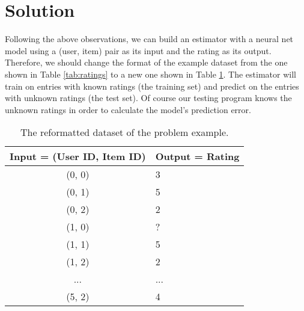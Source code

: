\documentclass[letterpaper]{article}
\begin{document}
\section{Solution}
Following the above observations, we can build an estimator with a neural net 
model using a (user, item) pair as its input and the rating as its output.
Therefore, we should change the format of the example dataset from the one 
shown in Table \ref{tab:ratings} to a new one shown in Table \ref{tab:rating}.
The estimator will train on entries with known ratings (the training set) 
and predict on the entries with unknown ratings (the test set).
Of course our testing program knows the unknown ratings in order to calculate 
the model's prediction error.
\begin{table}[!htb]
	\centering
	\caption{The reformatted dataset of the problem example.}
	\begin{tabularx}{0.47\textwidth}{|c|X|}  \hline \rowcolor{blue!50}
		Input = (User ID, Item ID) & Output = Rating \\ \hline
		(0, 0)                     & 3 \\ \hline
		(0, 1)                     & 5 \\ \hline
		(0, 2)                     & 2 \\ \hline
		(1, 0)                     & ? \\ \hline
		(1, 1)                     & 5 \\ \hline
		(1, 2)                     & 2 \\ \hline
		...                        & ... \\ \hline
		(5, 2)                     & 4 \\ \hline
	\end{tabularx}
	\label{tab:rating}
\end{table}
\end{document}
